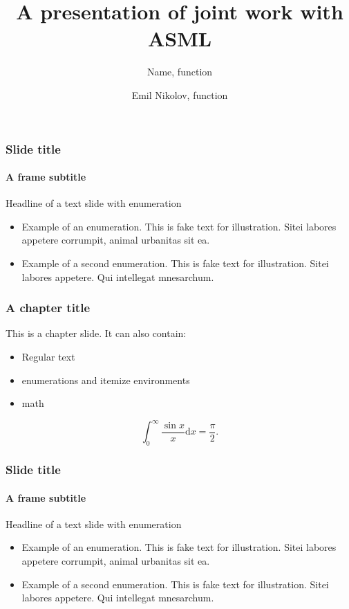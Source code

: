 \documentclass[t,aspectratio=169]{beamer}
\begin{document}
\renewcommand{\companylogosizemultiplicationfactor}{1}

\title{A presentation of joint work with ASML}
\subtitle{}
\author{Name, function}

\begin{titleframe}[variant=2,bgimage=titlebgimg.jpg]
\end{titleframe}


\begin{frame}
  \frametitle{Slide title}
  \framesubtitle{A frame subtitle}
  Headline of a text slide with enumeration
  \begin{itemize}
    \item Example of an enumeration. This is fake text for illustration. Sitei labores appetere corrumpit, animal urbanitas sit ea.
    \item Example of a second enumeration. This is fake text for illustration. Sitei labores appetere. Qui intellegat mnesarchum.
  \end{itemize}
\end{frame}

\begin{chapterframe}
  \frametitle{A chapter title}
  
  This is a chapter slide. It can also contain:
  \begin{itemize}
    \item Regular text
    \item enumerations and itemize environments
    \item math
  \end{itemize}
  \[
    \int_0^\infty \frac{\sin x}{x} \text{d}x=\frac{\pi}{2}.
  \]
\end{chapterframe}


\renewcommand{\companylogosizemultiplicationfactor}{1.5} %
\title{}
\subtitle{}
\author{Emil Nikolov, function}

\begin{titleframe}[variant=2,bgimage=titlebgimg.jpg]
\end{titleframe}


\begin{frame}
  \frametitle{Slide title}
  \framesubtitle{A frame subtitle}
  Headline of a text slide with enumeration
  \begin{itemize}
    \item Example of an enumeration. This is fake text for illustration. Sitei labores appetere corrumpit, animal urbanitas sit ea.
    \item Example of a second enumeration. This is fake text for illustration. Sitei labores appetere. Qui intellegat mnesarchum.
  \end{itemize}
\end{frame}
\end{document}
